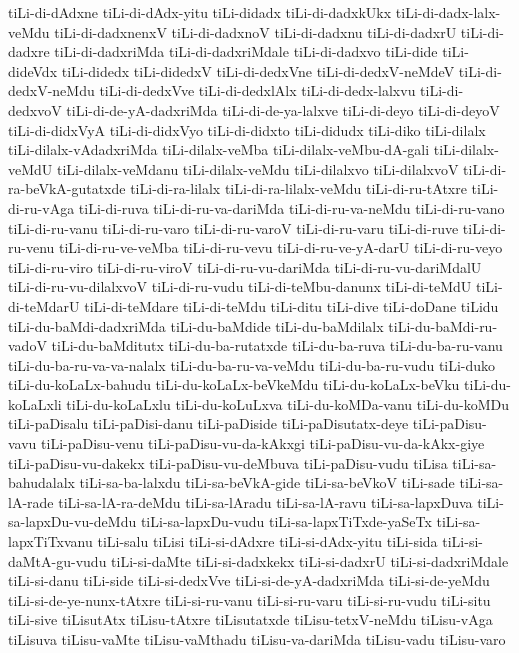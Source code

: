 {tiLi-di-dAdxne
tiLi-di-dAdx-yitu
tiLi-didadx
tiLi-di-dadxkUkx
tiLi-di-dadx-lalx-veMdu
tiLi-di-dadxnenxV
tiLi-di-dadxnoV
tiLi-di-dadxnu
tiLi-di-dadxrU
tiLi-di-dadxre
tiLi-di-dadxriMda
tiLi-di-dadxriMdale
tiLi-di-dadxvo
tiLi-dide
tiLi-dideVdx
tiLi-didedx
tiLi-didedxV
tiLi-di-dedxVne
tiLi-di-dedxV-neMdeV
tiLi-di-dedxV-neMdu
tiLi-di-dedxVve
tiLi-di-dedxlAlx
tiLi-di-dedx-lalxvu
tiLi-di-dedxvoV
tiLi-di-de-yA-dadxriMda
tiLi-di-de-ya-lalxve
tiLi-di-deyo
tiLi-di-deyoV
tiLi-di-didxVyA
tiLi-di-didxVyo
tiLi-di-didxto
tiLi-didudx
tiLi-diko
tiLi-dilalx
tiLi-dilalx-vAdadxriMda
tiLi-dilalx-veMba
tiLi-dilalx-veMbu-dA-gali
tiLi-dilalx-veMdU
tiLi-dilalx-veMdanu
tiLi-dilalx-veMdu
tiLi-dilalxvo
tiLi-dilalxvoV
tiLi-di-ra-beVkA-gutatxde
tiLi-di-ra-lilalx
tiLi-di-ra-lilalx-veMdu
tiLi-di-ru-tAtxre
tiLi-di-ru-vAga
tiLi-di-ruva
tiLi-di-ru-va-dariMda
tiLi-di-ru-va-neMdu
tiLi-di-ru-vano
tiLi-di-ru-vanu
tiLi-di-ru-varo
tiLi-di-ru-varoV
tiLi-di-ru-varu
tiLi-di-ruve
tiLi-di-ru-venu
tiLi-di-ru-ve-veMba
tiLi-di-ru-vevu
tiLi-di-ru-ve-yA-darU
tiLi-di-ru-veyo
tiLi-di-ru-viro
tiLi-di-ru-viroV
tiLi-di-ru-vu-dariMda
tiLi-di-ru-vu-dariMdalU
tiLi-di-ru-vu-dilalxvoV
tiLi-di-ru-vudu
tiLi-di-teMbu-danunx
tiLi-di-teMdU
tiLi-di-teMdarU
tiLi-di-teMdare
tiLi-di-teMdu
tiLi-ditu
tiLi-dive
tiLi-doDane
tiLidu
tiLi-du-baMdi-dadxriMda
tiLi-du-baMdide
tiLi-du-baMdilalx
tiLi-du-baMdi-ru-vadoV
tiLi-du-baMditutx
tiLi-du-ba-rutatxde
tiLi-du-ba-ruva
tiLi-du-ba-ru-vanu
tiLi-du-ba-ru-va-va-nalalx
tiLi-du-ba-ru-va-veMdu
tiLi-du-ba-ru-vudu
tiLi-duko
tiLi-du-koLaLx-bahudu
tiLi-du-koLaLx-beVkeMdu
tiLi-du-koLaLx-beVku
tiLi-du-koLaLxli
tiLi-du-koLaLxlu
tiLi-du-koLuLxva
tiLi-du-koMDa-vanu
tiLi-du-koMDu
tiLi-paDisalu
tiLi-paDisi-danu
tiLi-paDiside
tiLi-paDisutatx-deye
tiLi-paDisu-vavu
tiLi-paDisu-venu
tiLi-paDisu-vu-da-kAkxgi
tiLi-paDisu-vu-da-kAkx-giye
tiLi-paDisu-vu-dakekx
tiLi-paDisu-vu-deMbuva
tiLi-paDisu-vudu
tiLisa
tiLi-sa-bahudalalx
tiLi-sa-ba-lalxdu
tiLi-sa-beVkA-gide
tiLi-sa-beVkoV
tiLi-sade
tiLi-sa-lA-rade
tiLi-sa-lA-ra-deMdu
tiLi-sa-lAradu
tiLi-sa-lA-ravu
tiLi-sa-lapxDuva
tiLi-sa-lapxDu-vu-deMdu
tiLi-sa-lapxDu-vudu
tiLi-sa-lapxTiTxde-yaSeTx
tiLi-sa-lapxTiTxvanu
tiLi-salu
tiLisi
tiLi-si-dAdxre
tiLi-si-dAdx-yitu
tiLi-sida
tiLi-si-daMtA-gu-vudu
tiLi-si-daMte
tiLi-si-dadxkekx
tiLi-si-dadxrU
tiLi-si-dadxriMdale
tiLi-si-danu
tiLi-side
tiLi-si-dedxVve
tiLi-si-de-yA-dadxriMda
tiLi-si-de-yeMdu
tiLi-si-de-ye-nunx-tAtxre
tiLi-si-ru-vanu
tiLi-si-ru-varu
tiLi-si-ru-vudu
tiLi-situ
tiLi-sive
tiLisutAtx
tiLisu-tAtxre
tiLisutatxde
tiLisu-tetxV-neMdu
tiLisu-vAga
tiLisuva
tiLisu-vaMte
tiLisu-vaMthadu
tiLisu-va-dariMda
tiLisu-vadu
tiLisu-varo
}
